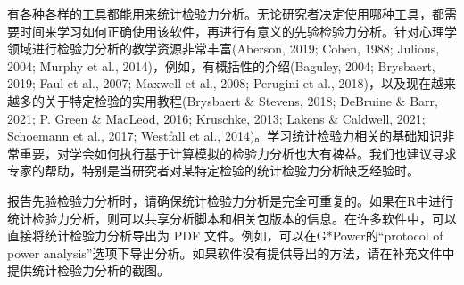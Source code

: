 \documentclass[
  letterpaper,
  DIV=11,
  numbers=noendperiod]{scrreprt}
\newenvironment{Shaded}{\begin{snugshade}}{\end{snugshade}}
\newcommand{\AttributeTok}[1]{\textcolor[rgb]{0.40,0.45,0.13}{#1}}
\newcommand{\CommentTok}[1]{\textcolor[rgb]{0.37,0.37,0.37}{#1}}
\newcommand{\ControlFlowTok}[1]{\textcolor[rgb]{0.00,0.23,0.31}{#1}}
\newcommand{\DecValTok}[1]{\textcolor[rgb]{0.68,0.00,0.00}{#1}}
\newcommand{\FloatTok}[1]{\textcolor[rgb]{0.68,0.00,0.00}{#1}}
\newcommand{\FunctionTok}[1]{\textcolor[rgb]{0.28,0.35,0.67}{#1}}
\newcommand{\NormalTok}[1]{\textcolor[rgb]{0.00,0.23,0.31}{#1}}
\newcommand{\OtherTok}[1]{\textcolor[rgb]{0.00,0.23,0.31}{#1}}
\newcommand{\SpecialCharTok}[1]{\textcolor[rgb]{0.37,0.37,0.37}{#1}}
\begin{document}
\begin{Shaded}
\end{Shaded}

有各种各样的工具都能用来统计检验力分析。无论研究者决定使用哪种工具，都需要时间来学习如何正确使用该软件，再进行有意义的先验检验力分析。针对心理学领域进行检验力分析的教学资源非常丰富(Aberson,
2019; Cohen, 1988; Julious, 2004; Murphy et al.,
2014)，例如，有概括性的介绍(Baguley, 2004; Brysbaert, 2019; Faul et al.,
2007; Maxwell et al., 2008; Perugini et al.,
2018)，以及现在越来越多的关于特定检验的实用教程(Brysbaert \& Stevens,
2018; DeBruine \& Barr, 2021; P. Green \& MacLeod, 2016; Kruschke, 2013;
Lakens \& Caldwell, 2021; Schoemann et al., 2017; Westfall et al.,
2014)。学习统计检验力相关的基础知识非常重要，对学会如何执行基于计算模拟的检验力分析也大有裨益。我们也建议寻求专家的帮助，特别是当研究者对某特定检验的统计检验力分析缺乏经验时。

报告先验检验力分析时，请确保统计检验力分析是完全可重复的。如果在R中进行统计检验力分析，则可以共享分析脚本和相关包版本的信息。在许多软件中，可以直接将统计检验力分析导出为
PDF 文件。例如，可以在G*Power的``protocol of power
analysis''选项下导出分析。如果软件没有提供导出的方法，请在补充文件中提供统计检验力分析的截图。
\end{document}
